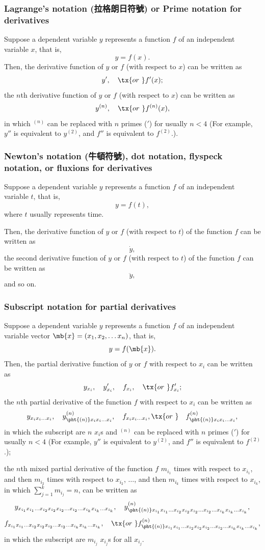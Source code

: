 \documentclass[a4paper,12pt]{report}
\begin{document}
\begin{itemize}
\begin{itemize}
\subsubsection{Lagrange's notation (拉格朗日符號) or Prime notation for derivatives}
Suppose a dependent variable $y$ represents a function $f$ of an independent variable $x$, that is,
\[y=f(x).\]
Then, the derivative function of $y$ or $f$ (with respect to $x$) can be written as
\[y',\quad\tx{or\ }f'(x);\]
the $n$th derivative function of $y$ or $f$ (with respect to $x$) can be written as
\[y^{(n)},\quad\tx{or\ }f^{(n)}(x),\]
in which $^{(n)}$ can be replaced with $n$ primes ($'$) for usually $n<4$ (For example, $y''$ is equivalent to $y^{(2)}$, and $f''$ is equivalent to $f^{(2)}$.).
\subsubsection{Newton's notation (牛頓符號), dot notation, flyspeck notation, or fluxions for derivatives}
Suppose a dependent variable $y$ represents a function $f$ of an independent variable $t$, that is,
\[y=f(t),\]
where $t$ usually represents time.

Then, the derivative function of $y$ or $f$ (with respect to $t$) of the function $f$ can be written as
\[\dot{y},\]
the second derivative function of $y$ or $f$ (with respect to $t$) of the function $f$ can be written as
\[\ddot{y},\]
and so on.
\subsubsection{Subscript notation for partial derivatives}
Suppose a dependent variable $y$ represents a function $f$ of an independent variable vector $\mb{x}=(x_1,x_2,\dots x_n)$, that is,
\[y=f(\mb{x}).\]
Then, the partial derivative function of $y$ or $f$ with respect to $x_i$ can be written as
\[y_{x_i},\quad y'_{x_i},\quad f_{x_i},\quad \tx{or\ }f'_{x_i};\]
the $n$th partial derivative of the function $f$ with respect to $x_i$ can be written as
\[y_{x_ix_i\dots  x_i},\quad y^{(n)}_{\pht{(n)}x_ix_i\dots  x_i},\quad f_{x_ix_i\dots  x_i},\tx{or\ }\quad f^{(n)}_{\pht{(n)}x_ix_i\dots  x_i},\]
in which the subscript are $n$ $x_i$s and $^{(n)}$ can be replaced with $n$ primes ($'$) for usually $n<4$ (For example, $y''$ is equivalent to $y^{(2)}$, and $f''$ is equivalent to $f^{(2)}$.);

the $n$th mixed partial derivative of the function $f$ $m_{i_1}$ times with respect to $x_{i_1}$, and then $m_{i_2}$ times with respect to $x_{i_2}$, $\ldots$, and then $m_{i_k}$ times with respect to $x_{i_k}$, in which $\sum_{j=1}^km_{i_j}=n$, can be written as
\[y_{x_{i_1}x_{i_1}\dots  x_{i_2}x_{i_2}x_{i_2}\dots  x_{i_2}\dots  x_{i_k}x_{i_k}\dots  x_{i_k}},\quad y^{(n)}_{\pht{(n)}x_{i_1}x_{i_1}\dots  x_{i_2}x_{i_2}x_{i_2}\dots  x_{i_2}\dots  x_{i_k}x_{i_k}\dots  x_{i_k}},\]
\[f_{x_{i_1}x_{i_1}\dots  x_{i_2}x_{i_2}x_{i_2}\dots  x_{i_2}\dots  x_{i_k}x_{i_k}\dots  x_{i_k}},\quad \tx{or\ }f^{(n)}_{\pht{(n)}x_{i_1}x_{i_1}\dots  x_{i_2}x_{i_2}x_{i_2}\dots  x_{i_2}\dots  x_{i_k}x_{i_k}\dots  x_{i_k}},\]
in which the subscript are $m_{i_j}$ $x_{i_j}$s for all $x_{i_j}$.

\end{itemize}
\end{itemize}
\end{document}
